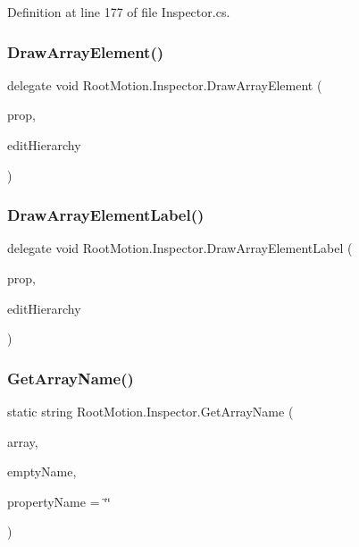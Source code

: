 Definition at line 177 of file Inspector.\+cs.

\mbox{\label{class_root_motion_1_1_inspector_a369c57a74b02e7f38059b2bb5e7ef36c}} 
\subsubsection{\texorpdfstring{Draw\+Array\+Element()}{DrawArrayElement()}}
{\footnotesize\ttfamily delegate void Root\+Motion.\+Inspector.\+Draw\+Array\+Element (\begin{DoxyParamCaption}\item[{Serialized\+Property}]{prop,  }\item[{bool}]{edit\+Hierarchy }\end{DoxyParamCaption})}

\mbox{\label{class_root_motion_1_1_inspector_aa060038e590bda971023ece8f2945330}} 
\subsubsection{\texorpdfstring{Draw\+Array\+Element\+Label()}{DrawArrayElementLabel()}}
{\footnotesize\ttfamily delegate void Root\+Motion.\+Inspector.\+Draw\+Array\+Element\+Label (\begin{DoxyParamCaption}\item[{Serialized\+Property}]{prop,  }\item[{bool}]{edit\+Hierarchy }\end{DoxyParamCaption})}

\mbox{\label{class_root_motion_1_1_inspector_a3b89f376131fbdeec94074fe6759fffa}} 
\subsubsection{\texorpdfstring{Get\+Array\+Name()}{GetArrayName()}}
{\footnotesize\ttfamily static string Root\+Motion.\+Inspector.\+Get\+Array\+Name (\begin{DoxyParamCaption}\item[{Serialized\+Property}]{array,  }\item[{string}]{empty\+Name,  }\item[{string}]{property\+Name = {\ttfamily \char`\"{}\char`\"{}} }\end{DoxyParamCaption})\hspace{0.3cm}{\ttfamily [static]}}




